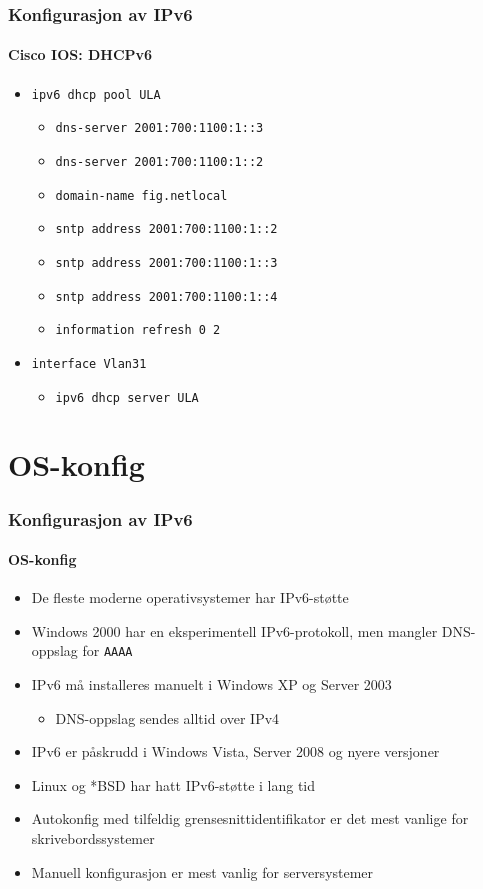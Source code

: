 \begin{frame}%
  \frametitle{Konfigurasjon av IPv6}
  \framesubtitle{Cisco IOS: DHCPv6}
  \begin{itemize}%
  \item \texttt{ipv6 dhcp pool ULA}
    \begin{itemize}%
    \item \texttt{dns-server 2001:700:1100:1::3}
    \item \texttt{dns-server 2001:700:1100:1::2}
    \item \texttt{domain-name fig.netlocal}
    \item \texttt{sntp address 2001:700:1100:1::2}
    \item \texttt{sntp address 2001:700:1100:1::3}
    \item \texttt{sntp address 2001:700:1100:1::4}
    \item \texttt{information refresh 0 2}
    \end{itemize}
  \item \texttt{interface Vlan31}
    \begin{itemize}%
    \item \texttt{ipv6 dhcp server ULA}
    \end{itemize}
  \end{itemize}
\end{frame}

\section{OS-konfig}
\begin{frame}%
  \frametitle{Konfigurasjon av IPv6}
  \framesubtitle{OS-konfig}
  \pause
  \begin{itemize}[<+->]
  \item De fleste moderne operativsystemer har IPv6-støtte
  \item Windows 2000 har en eksperimentell IPv6-protokoll, men mangler
    DNS-oppslag for \texttt{AAAA}
  \item IPv6 må installeres manuelt i Windows XP og Server 2003
    \begin{itemize}[<+->]
    \item DNS-oppslag sendes alltid over \alert{IPv4}
    \end{itemize}
  \item IPv6 er påskrudd i Windows Vista, Server 2008 og nyere versjoner
  \item Linux og *BSD har hatt IPv6-støtte i lang tid
  \item Autokonfig med tilfeldig grensesnittidentifikator er det mest
    vanlige for skrivebordssystemer
  \item Manuell konfigurasjon er mest vanlig for serversystemer
  \end{itemize}
\end{frame}

